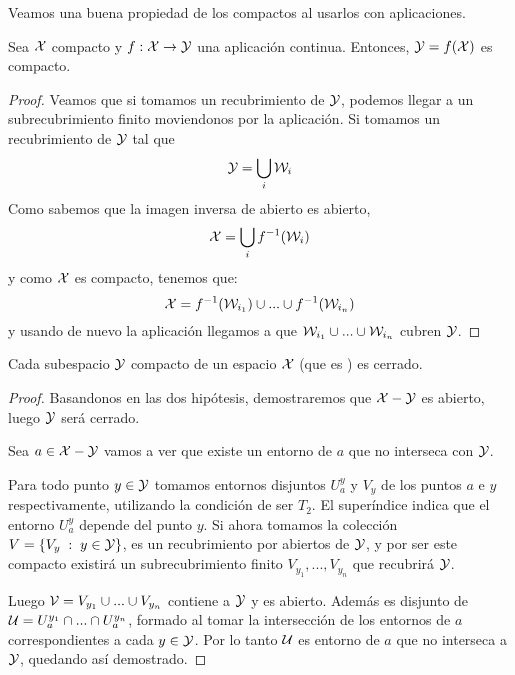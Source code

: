 Veamos una buena propiedad de los compactos al usarlos con aplicaciones.


\begin{prop}
	\label{comp_comp_comp}
	Sea $\mathcal{X}$ compacto y $f:\mathcal{X} \rightarrow \mathcal{Y}$ una aplicación continua. Entonces, $\mathcal{Y} = f(\mathcal{X})$ es compacto.
	\begin{proof}
		Veamos que si tomamos un recubrimiento de $\mathcal{Y}$, podemos llegar a un subrecubrimiento finito moviendonos por la aplicación. Si tomamos un recubrimiento de $\mathcal{Y}$ tal que
		\begin{equation*}
			\mathcal{Y} = \bigcup_{i}\mathcal{W}_i
		\end{equation*}
		Como sabemos que la imagen inversa de abierto es abierto,
		\begin{equation*}
			\mathcal{X} = \bigcup_{i}f^{-1}(\mathcal{W}_i)
		\end{equation*}
		y como $\mathcal{X}$ es compacto, tenemos que:
		\begin{equation*}
			\mathcal{X}  = f^{-1}(\mathcal{W}_{i_1}) \cup ... \cup f^{-1}(\mathcal{W}_{i_n})
		\end{equation*}
		y usando de nuevo la aplicación llegamos a que $\mathcal{W}_{i_1} \cup ... \cup \mathcal{W}_{i_n}$ cubren $\mathcal{Y}$.
	\end{proof}
\end{prop}


\begin{prop}\label{T6:prop_compacto en t2 es cerrado}
	Cada subespacio $\mathcal{Y}$ compacto de un espacio $\mathcal{X}$ (que es \hausdorff) es cerrado.
	\begin{proof}
		Basandonos en las dos hipótesis, demostraremos que $\mathcal{X} - \mathcal{Y}$ es abierto, luego $\mathcal{Y}$ será cerrado.
		
		Sea $a \in \mathcal{X}-\mathcal{Y}$ vamos a ver que existe un entorno de $a$ que no interseca con $\mathcal{Y}$.
		
		Para todo punto $y \in \mathcal{Y}$ tomamos entornos disjuntos $U_a^y$ y $V_y$ de los puntos $a$ e $y$ respectivamente, utilizando la condición de ser $T_2$. El superíndice indica que el entorno $U_a^y$ depende del punto $y$. Si ahora tomamos la colección $V = \{V_y \;:\; y \in \mathcal{Y}\}$, es un recubrimiento por abiertos de $\mathcal{Y}$, y por ser este compacto existirá un subrecubrimiento finito $V_{y_1}, ..., V_{y_n}$ que recubrirá $\mathcal{Y}$.
		
		Luego $\mathcal{V} = V_{y_1} \cup ... \cup V_{y_n}$ contiene a $\mathcal{Y}$ y es abierto. Además es disjunto de $\mathcal{U} = U_a^{y_1} \cap ... \cap U_a^{y_n}$, formado al tomar la intersección de los entornos de $a$ correspondientes a cada $y\in\mathcal{Y}$. Por lo tanto $\mathcal{U}$ es entorno de $a$ que no interseca a $\mathcal{Y}$, quedando así demostrado.
	\end{proof}
\end{prop}

